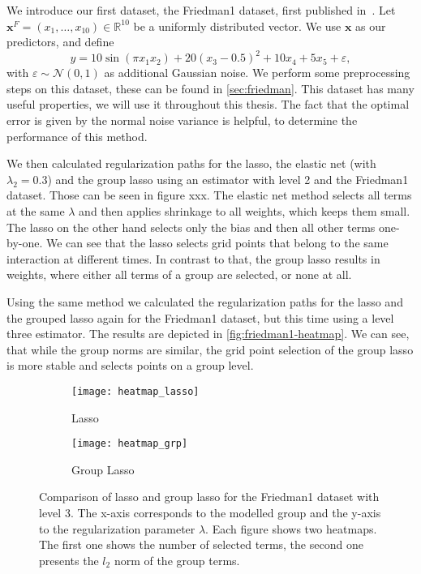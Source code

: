 We introduce our first dataset, the Friedman1 dataset, first published
in~\cite{datasets-friedman}.
Let \(\bm{x}^F = (x_1, \ldots, x_{10}) \in \mathbb{R}^{10}\) be a uniformly distributed vector.
We use \(\bm{x}\) as our predictors, and define
\begin{equation}\label{eq:friedman1}
  y = 10 \sin(\pi x_1 x_2) + 20(x_3 - 0.5)^2 + 10x_4 + 5x_5 + \varepsilon,
\end{equation}
with \(\varepsilon \sim \mathcal{N}(0,1)\) as additional Gaussian noise.
We perform some preprocessing steps on this dataset, these can be found in \cref{sec:friedman}.
This dataset has many useful properties, we will use it throughout this thesis.
The fact that the optimal error is given by the normal noise variance is
helpful, to determine the performance of this method.

We then calculated regularization paths for the lasso, the elastic net (with
\(\lambda_2 = 0.3\)) and the group lasso using an estimator with level 2 and the
Friedman1 dataset.
Those can be seen in figure xxx.
The elastic net method selects all terms at the same \(\lambda\) and then
applies shrinkage to all weights, which keeps them small.
The lasso on the other hand selects only the bias and then all other terms
one-by-one.
We can see that the lasso selects grid points that belong to the same
interaction at different times.
In contrast to that, the group lasso results in weights, where either all terms
of a group are selected, or none at all.

Using the same method we calculated the regularization paths for the lasso and
the grouped lasso again for the Friedman1 dataset, but this time using a level
three estimator.
The results are depicted in \vref{fig:friedman1-heatmap}.
We can see, that while the group norms are similar, the grid point selection of
the group lasso is more stable and selects points on a group level.

\begin{figure}[htb]
  \centering
  \begin{subfigure}[b]{\textwidth}
    \centering
    \texttt{[image: heatmap\_lasso]}
    \caption{Lasso}
  \end{subfigure}
  \begin{subfigure}[b]{\textwidth}
    \centering
    \texttt{[image: heatmap\_grp]}
    \caption{Group Lasso}
  \end{subfigure}
  \caption{Comparison of lasso and group lasso for the Friedman1 dataset with
  level 3.
  The x-axis corresponds to the modelled group and the y-axis to the regularization
  parameter \(\lambda\). Each figure shows two heatmaps. The first one shows
  the number of selected terms, the second one presents the \(l_2\) norm of the
  group terms.}\label{fig:friedman1-heatmap}
\end{figure}

